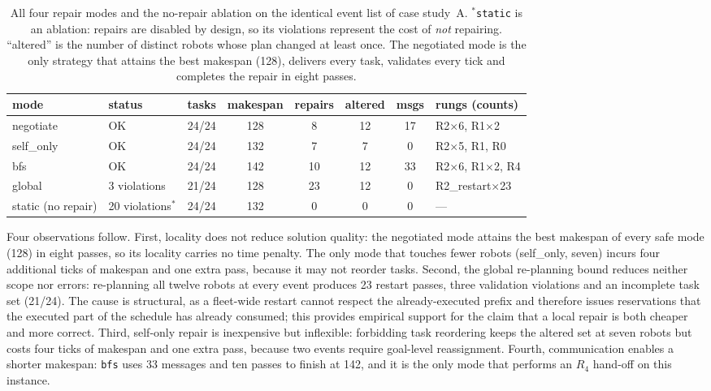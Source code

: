 \documentclass[10pt,a4paper]{article}
\newcommand{\code}[1]{\texttt{#1}}
\begin{document}
\begin{table}[H]
\centering
\small
\setlength{\tabcolsep}{5pt}
\begin{tabular}{@{}l l c c c c c l@{}}
\toprule
\textbf{mode} & \textbf{status} & \textbf{tasks} & \textbf{makespan} &
\textbf{repairs} & \textbf{altered} & \textbf{msgs} & \textbf{rungs (counts)}\\
\midrule
negotiate & OK            & 24/24 & 128 & 8  & 12 & 17 & R2$\times$6, R1$\times$2\\
self\_only & OK           & 24/24 & 132 & 7  & 7  & 0  & R2$\times$5, R1, R0\\
bfs       & OK            & 24/24 & 142 & 10 & 12 & 33 & R2$\times$6, R1$\times$2, R4\\
global    & 3 violations  & 21/24 & 128 & 23 & 12 & 0  & R2\_restart$\times$23\\
static (no repair) & 20 violations$^{*}$ & 24/24 & 132 & 0 & 0 & 0 & ---\\
\bottomrule
\end{tabular}
\caption{All four repair modes and the no-repair ablation on the identical
event list of case study~A.  $^{*}$\code{static} is an ablation: repairs are
disabled by design, so its violations represent the cost of \emph{not}
repairing.  ``altered'' is the number of distinct robots whose plan changed
at least once.  The negotiated mode is the only strategy that attains the
best makespan (128), delivers every task, validates every tick and completes
the repair in eight passes.}
\label{tab:compare}
\end{table}

Four observations follow.  First, locality does not reduce solution quality:
the negotiated mode attains the best makespan of every safe mode (128) in
eight passes, so its locality carries no time penalty.  The only mode that
touches fewer robots (self\_only, seven) incurs four additional ticks of
makespan and one extra pass, because it may not reorder tasks.  Second, the
global re-planning bound reduces neither scope nor errors: re-planning all
twelve robots at every event produces 23 restart passes, three validation
violations and an incomplete task set (21/24).  The cause is structural, as a
fleet-wide restart cannot respect the already-executed prefix and therefore
issues reservations that the executed part of the schedule has already
consumed; this provides empirical support for the claim that a local repair
is both cheaper and more correct.  Third, self-only repair is inexpensive but
inflexible: forbidding task reordering keeps the altered set at seven robots
but costs four ticks of makespan and one extra pass, because two events
require goal-level reassignment.  Fourth, communication enables a shorter
makespan: \code{bfs} uses 33 messages and ten passes to finish at 142, and it
is the only mode that performs an $R_4$ hand-off on this instance.
\end{document}
